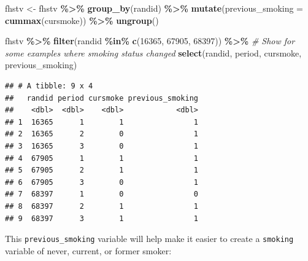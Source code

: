 \documentclass[
]{book}
\newenvironment{Shaded}{\begin{snugshade}}{\end{snugshade}}
\newcommand{\AttributeTok}[1]{\textcolor[rgb]{0.13,0.29,0.53}{#1}}
\newcommand{\CommentTok}[1]{\textcolor[rgb]{0.56,0.35,0.01}{\textit{#1}}}
\newcommand{\DecValTok}[1]{\textcolor[rgb]{0.00,0.00,0.81}{#1}}
\newcommand{\FunctionTok}[1]{\textcolor[rgb]{0.13,0.29,0.53}{\textbf{#1}}}
\newcommand{\NormalTok}[1]{#1}
\newcommand{\OtherTok}[1]{\textcolor[rgb]{0.56,0.35,0.01}{#1}}
\newcommand{\SpecialCharTok}[1]{\textcolor[rgb]{0.81,0.36,0.00}{\textbf{#1}}}
\begin{document}
\begin{Shaded}
\begin{Highlighting}[]
\NormalTok{fhstv }\OtherTok{\textless{}{-}}\NormalTok{ fhstv }\SpecialCharTok{\%\textgreater{}\%} 
  \FunctionTok{group\_by}\NormalTok{(randid) }\SpecialCharTok{\%\textgreater{}\%} 
  \FunctionTok{mutate}\NormalTok{(}\AttributeTok{previous\_smoking =} \FunctionTok{cummax}\NormalTok{(cursmoke)) }\SpecialCharTok{\%\textgreater{}\%} 
  \FunctionTok{ungroup}\NormalTok{()}

\NormalTok{fhstv }\SpecialCharTok{\%\textgreater{}\%} 
  \FunctionTok{filter}\NormalTok{(randid }\SpecialCharTok{\%in\%} \FunctionTok{c}\NormalTok{(}\DecValTok{16365}\NormalTok{, }\DecValTok{67905}\NormalTok{, }\DecValTok{68397}\NormalTok{)) }\SpecialCharTok{\%\textgreater{}\%} \CommentTok{\# Show for some examples where smoking status changed}
  \FunctionTok{select}\NormalTok{(randid, period, cursmoke, previous\_smoking)}
\end{Highlighting}
\end{Shaded}

\begin{verbatim}
## # A tibble: 9 x 4
##   randid period cursmoke previous_smoking
##    <dbl>  <dbl>    <dbl>            <dbl>
## 1  16365      1        1                1
## 2  16365      2        0                1
## 3  16365      3        0                1
## 4  67905      1        1                1
## 5  67905      2        1                1
## 6  67905      3        0                1
## 7  68397      1        0                0
## 8  68397      2        1                1
## 9  68397      3        1                1
\end{verbatim}

This \texttt{previous\_smoking} variable will help make it easier to create a \texttt{smoking} variable of never, current, or former smoker:
\end{document}
